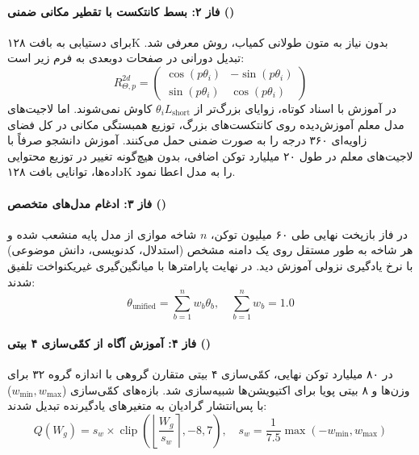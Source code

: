 \paragraph*{فاز ۲: بسط کانتکست با تقطیر مکانی ضمنی ()}
برای دستیابی به بافت ۱۲۸K بدون نیاز به متون طولانی کمیاب، روش \textbf{} معرفی شد. تبدیل دورانی  در صفحات دوبعدی به فرم زیر است:
\begin{equation}
    R_{\Theta, p}^{2d} = \begin{pmatrix} \cos(p \theta_i) & -\sin(p \theta_i) \\ \sin(p \theta_i) & \cos(p \theta_i) \end{pmatrix}
\end{equation}
در آموزش با اسناد کوتاه، زوایای بزرگ‌تر از $\theta_i L_{\text{short}}$ کاوش نمی‌شوند. اما لاجیت‌های مدل معلم آموزش‌دیده روی کانتکست‌های بزرگ، توزیع همبستگی مکانی در کل فضای زاویه‌ای ۳۶۰ درجه را به صورت ضمنی حمل می‌کنند. آموزش دانشجو صرفاً با لاجیت‌های معلم در طول ۲۰ میلیارد توکن اضافی، بدون هیچ‌گونه تغییر در توزیع محتوایی داده‌ها، توانایی بافت ۱۲۸K را به مدل اعطا نمود.

\paragraph*{فاز ۳: ادغام مدل‌های متخصص ()}
در فاز بازپخت نهایی طی ۶۰ میلیون توکن، $n$ شاخه موازی از مدل پایه منشعب شده و هر شاخه به طور مستقل روی یک دامنه مشخص (استدلال، کدنویسی، دانش موضوعی) با نرخ یادگیری نزولی آموزش دید. در نهایت پارامترها با میانگین‌گیری غیریکنواخت تلفیق شدند:
\begin{equation}
    \theta_{\text{unified}} = \sum_{b=1}^n w_b \theta_b, \quad \sum_{b=1}^n w_b = 1.0
\end{equation}

\paragraph*{فاز ۴: آموزش آگاه از کمّی‌سازی ۴ بیتی ()}
در ۸۰ میلیارد توکن نهایی، کمّی‌سازی ۴ بیتی متقارن گروهی با اندازه گروه ۳۲ برای وزن‌ها و ۸ بیتی پویا برای اکتیویشن‌ها شبیه‌سازی شد. بازه‌های کمّی‌سازی ($w_{\min}, w_{\max}$) با پس‌انتشار گرادیان به متغیرهای یادگیرنده تبدیل شدند:
\begin{equation}
    Q(W_g) = s_w \times \operatorname{clip}\left( \left\lfloor \frac{W_g}{s_w} \right\rceil, -8, 7 \right), \quad s_w = \frac{1}{7.5} \max(-w_{\min}, w_{\max})
\end{equation}